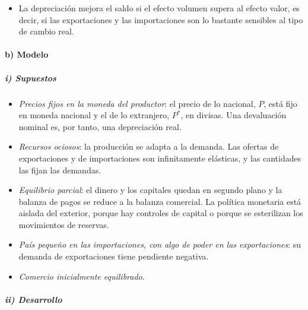 \documentclass[11pt]{article}
\begin{document}
\begin{itemize}
  \begin{enumerate}
  \item el  (o precio), negativo: cada unidad importada cuesta más en moneda nacional;
  \item el , positivo: se exporta más y se importa menos, porque lo nacional se abarata frente a lo extranjero.
  \end{enumerate}
\item La depreciación mejora el saldo si el efecto volumen supera al efecto valor, es decir, si las exportaciones y las importaciones son lo bastante sensibles al tipo de cambio real.
\end{itemize}

\paragraph{b) Modelo}

\subparagraph{i) Supuestos}

\begin{itemize}
\item \emph{Precios fijos en la moneda del productor}: el precio de lo nacional, $P$, está fijo en moneda nacional y el de lo extranjero, $P^*$, en divisas. Una devaluación nominal es, por tanto, una depreciación real.
\item \emph{Recursos ociosos}: la producción se adapta a la demanda. Las ofertas de exportaciones y de importaciones son infinitamente elásticas, y las cantidades las fijan las demandas.
\item \emph{Equilibrio parcial}: el dinero y los capitales quedan en segundo plano y la balanza de pagos se reduce a la balanza comercial. La política monetaria está aislada del exterior, porque hay controles de capital o porque se esterilizan los movimientos de reservas.
\item \emph{País pequeño en las importaciones, con algo de poder en las exportaciones}: su demanda de exportaciones tiene pendiente negativa.
\item \emph{Comercio inicialmente equilibrado}.
\end{itemize}

\subparagraph{ii) Desarrollo}
\end{document}
